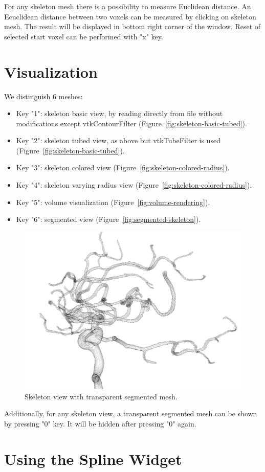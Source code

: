 For any skeleton mesh there is a possibility to measure Euclidean distance. An Ecuclidean distance between two voxels can be measured by clicking on skeleton mesh. The result will be displayed in bottom right corner of the window. Reset of selected start voxel can be performed with "x" key.

\section{Visualization}

We distinguish 6 meshes:
\begin{itemize}
	\item Key "1": skeleton basic view, by reading directly from file without modifications except vtkContourFilter (Figure~\ref{fig:skeleton-basic-tubed}).
	\item Key "2": skeleton tubed view, as above but vtkTubeFilter is used (Figure~\ref{fig:skeleton-basic-tubed}).
	\item Key "3": skeleton colored view (Figure~\ref{fig:skeleton-colored-radius}).
	\item Key "4": skeleton varying radius view (Figure~\ref{fig:skeleton-colored-radius}).
	\item Key "5": volume visualization (Figure~\ref{fig:volume-rendering}).
	\item Key "6": segmented view (Figure~\ref{fig:segmented-skeleton}).
\end{itemize}

\begin{figure}
	\centering
	\includegraphics[scale=0.4]{fig/skeleton-transparent-segmented}
	\caption{Skeleton view with transparent segmented mesh.}
	\label{fig:skeleton-transparent-segmented}
\end{figure}

Additionally, for any skeleton view, a transparent segmented mesh can be shown by pressing "0" key. It will be hidden after pressing "0" again.

\section{Using the Spline Widget}


